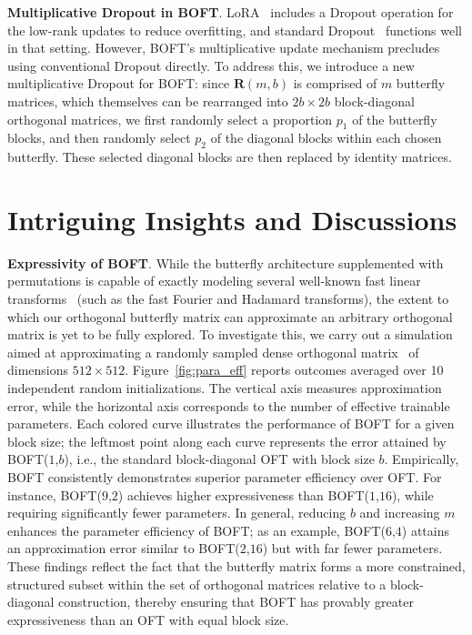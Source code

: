\textbf{Multiplicative Dropout in BOFT}. LoRA~\cite{hulora2022} includes a Dropout operation for the low-rank updates to reduce overfitting, and standard Dropout~\cite{srivastava2014dropout} functions well in that setting. However, BOFT’s multiplicative update mechanism precludes using conventional Dropout directly. To address this, we introduce a new multiplicative Dropout for BOFT: since $\bm{R}(m,b)$ is comprised of $m$ butterfly matrices, which themselves can be rearranged into $2b\times 2b$ block-diagonal orthogonal matrices, we first randomly select a proportion $p_1$ of the butterfly blocks, and then randomly select $p_2$ of the diagonal blocks within each chosen butterfly. These selected diagonal blocks are then replaced by identity matrices.

\section{Intriguing Insights and Discussions}

\textbf{Expressivity of BOFT}. While the butterfly architecture supplemented with permutations is capable of exactly modeling several well-known fast linear transforms~\cite{dao2019learning,dao2019kaleidoscope} (such as the fast Fourier and Hadamard transforms), the extent to which our orthogonal butterfly matrix can approximate an arbitrary orthogonal matrix is yet to be fully explored. To investigate this, we carry out a simulation aimed at approximating a randomly sampled dense orthogonal matrix~\cite{anderson1987generation} of dimensions $512\times 512$. Figure~\ref{fig:para_eff} reports outcomes averaged over 10 independent random initializations. The vertical axis measures approximation error, while the horizontal axis corresponds to the number of effective trainable parameters. Each colored curve illustrates the performance of BOFT for a given block size; the leftmost point along each curve represents the error attained by BOFT($1$,$b$), i.e., the standard block-diagonal OFT with block size $b$. Empirically, BOFT consistently demonstrates superior parameter efficiency over OFT. For instance, BOFT($9$,$2$) achieves higher expressiveness than BOFT($1$,$16$), while requiring significantly fewer parameters. In general, reducing $b$ and increasing $m$ enhances the parameter efficiency of BOFT; as an example, BOFT($6$,$4$) attains an approximation error similar to BOFT($2$,$16$) but with far fewer parameters. These findings reflect the fact that the butterfly matrix forms a more constrained, structured subset within the set of orthogonal matrices relative to a block-diagonal construction, thereby ensuring that BOFT has provably greater expressiveness than an OFT with equal block size.

